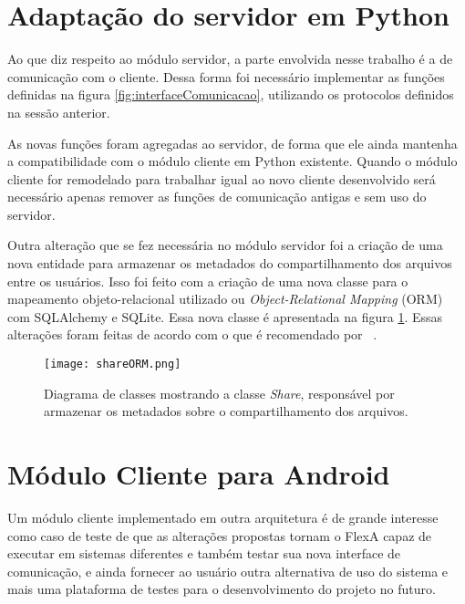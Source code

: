         
        \section{Adaptação do servidor em Python}
        
        
        Ao que diz respeito ao módulo servidor, a parte envolvida nesse trabalho é a de comunicação com o cliente. Dessa forma foi necessário implementar as funções definidas na figura \ref{fig:interfaceComunicacao}, utilizando os protocolos definidos na sessão anterior.
        
        As novas funções foram agregadas ao servidor, de forma que ele ainda mantenha a compatibilidade com o módulo cliente em Python existente. Quando o módulo cliente for remodelado para trabalhar igual ao novo cliente desenvolvido será necessário apenas remover as funções de comunicação antigas e sem uso do servidor.
        
        Outra alteração que se fez necessária no módulo servidor foi a criação de uma nova entidade para armazenar os metadados do compartilhamento dos arquivos entre os usuários. Isso foi feito com a criação de uma nova classe para o mapeamento objeto-relacional utilizado ou \textit{Object-Relational Mapping} (ORM) com SQLAlchemy e SQLite. Essa nova classe é apresentada na figura \ref{fig:shareORM}. Essas alterações foram feitas de acordo com o que é recomendado por ~\cite{sqlalchemy}.
        
        \begin{figure}
        \centering
        \texttt{[image: shareORM.png]}
        \caption{Diagrama de classes mostrando a classe \textit{Share}, responsável por armazenar os metadados sobre o compartilhamento dos arquivos.}
        \label{fig:shareORM}
        \end{figure}
        
        \section{Módulo Cliente para Android}
        
     
        Um módulo cliente implementado em outra arquitetura é de grande interesse como caso de teste de que as alterações propostas tornam o FlexA capaz de executar em sistemas diferentes e também testar sua nova interface de comunicação, e ainda fornecer ao usuário outra alternativa de uso do sistema e mais uma plataforma de testes para o desenvolvimento do projeto no futuro.
        
